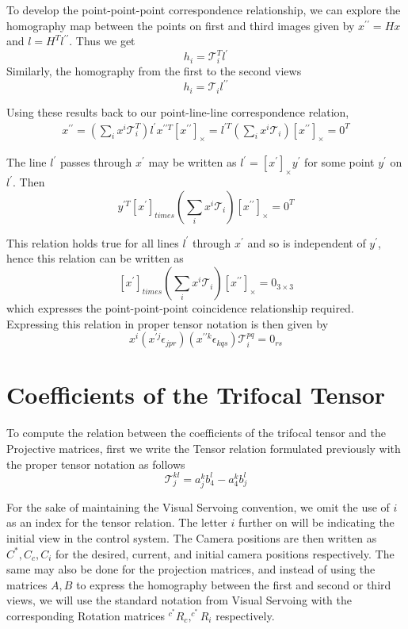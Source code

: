 To develop the point-point-point correspondence relationship, we can explore the homography map between the points on first and third images given by $x^{\prime \prime} = Hx$ and $l = H^{T}l^{\prime \prime}$. Thus we get
$$
  h_i = \mathcal{T}^{T}_{i}l^{\prime}
$$
Similarly, the homography from the first to the second views 
$$
  h_i = \mathcal{T}_{i}l^{\prime \prime}
$$

Using these results back to our point-line-line correspondence relation, 
\begin{gather*}
  x^{\prime \prime} = (\sum_{i} x^{i}\mathcal{T}^{T}_{i}) l^{\prime}
  x^{\prime \prime T}[x^{\prime \prime}]_{\times} = l^{\prime T} (\sum_{i} x^{i}\mathcal{T}_{i})[x^{\prime \prime}]_{\times} = 0^{T}
\end{gather*}

The line $l^{\prime}$ passes through $x^{\prime}$ may be written as $l^{\prime} = [x^{\prime}]_{\times}y^{\prime}$ for some point $y^{\prime}$ on $l^{\prime}$. Then
$$
  y^{\prime T} [x^{\prime}]_{times} (\sum_{i} x^{i}\mathcal{T}_{i})[x^{\prime \prime}]_{\times} = 0^{T}
$$

This relation holds true for all lines $l^{\prime}$ through $x^{\prime}$ and so is independent of $y^{\prime}$, hence this relation can be written as
$$
[x^{\prime}]_{times} (\sum_{i} x^{i}\mathcal{T}_{i})[x^{\prime \prime}]_{\times} = 0_{3\times 3}
$$
which expresses the point-point-point coincidence relationship required. Expressing this relation in proper tensor notation is then given by
$$
x^{i}(x^{\prime j} \epsilon_{jpr})(x^{\prime \prime k} \epsilon_{kqs})\mathcal{T}^{pq}_{i} = 0_{rs}
$$

\section*{Coefficients of the Trifocal Tensor}
To compute the relation between the coefficients of the trifocal tensor and the Projective matrices, first we write the Tensor relation formulated previously with the proper tensor notation as follows
$$
\mathcal{T}^{kl}_{j} = a^{k}_{j}b^{l}_{4} - a^{k}_{4}b^{l}_{j}
$$

For the sake of maintaining the Visual Servoing convention, we omit the use of $i$ as an index for the tensor relation. The letter $i$ further on will be indicating the initial view in the control system. The Camera positions are then written as $C^*,C_c,C_i$ for the desired, current, and initial camera positions respectively. The same may also be done for the projection matrices, and instead of using the matrices $A,B$ to express the homography between the first and second or third views, we will use the standard notation from Visual Servoing with the corresponding Rotation matrices $^{c^*}R_c, ^{c^*}R_i$ respectively.

